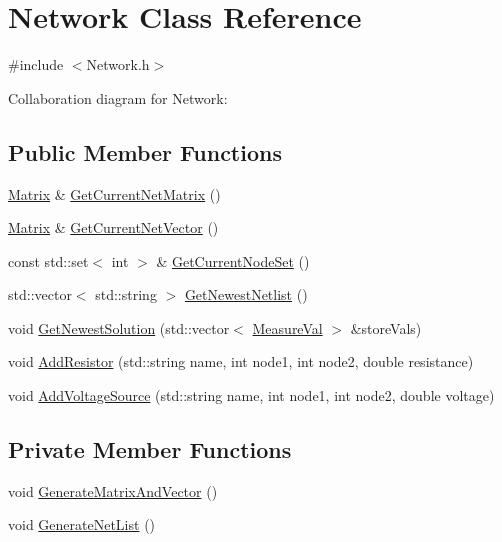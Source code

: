 \hypertarget{classNetwork}{}\section{Network Class Reference}
\label{classNetwork}


{\ttfamily \#include $<$Network.\+h$>$}



Collaboration diagram for Network\+:
\subsection*{Public Member Functions}
\begin{DoxyCompactItemize}
\item 
\hyperlink{classMatrix}{Matrix} \& \hyperlink{classNetwork_a0d542d208520c286e5418267525c183d}{Get\+Current\+Net\+Matrix} ()
\item 
\hyperlink{classMatrix}{Matrix} \& \hyperlink{classNetwork_a14a99e68dac334d31c127032b24cee0c}{Get\+Current\+Net\+Vector} ()
\item 
const std\+::set$<$ int $>$ \& \hyperlink{classNetwork_a355e3ef39f7178851cb230846d616cef}{Get\+Current\+Node\+Set} ()
\item 
std\+::vector$<$ std\+::string $>$ \hyperlink{classNetwork_addae3802a581406208810ce430a045f9}{Get\+Newest\+Netlist} ()
\item 
void \hyperlink{classNetwork_a0a1cbddfc25e2705cb46a58f1e385376}{Get\+Newest\+Solution} (std\+::vector$<$ \hyperlink{structMeasureVal}{Measure\+Val} $>$ \&store\+Vals)
\item 
void \hyperlink{classNetwork_a110bd81c8a0ace8eca270ffd12cff58a}{Add\+Resistor} (std\+::string name, int node1, int node2, double resistance)
\item 
void \hyperlink{classNetwork_a28d48c202d27f3f319ef1a837ab05974}{Add\+Voltage\+Source} (std\+::string name, int node1, int node2, double voltage)
\end{DoxyCompactItemize}
\subsection*{Private Member Functions}
\begin{DoxyCompactItemize}
\item 
void \hyperlink{classNetwork_af68724676fb5a5e1fdba8b82b5f0d0e5}{Generate\+Matrix\+And\+Vector} ()
\item 
void \hyperlink{classNetwork_a783abf2a3cb51f088682796304a988ff}{Generate\+Net\+List} ()
\end{DoxyCompactItemize}
